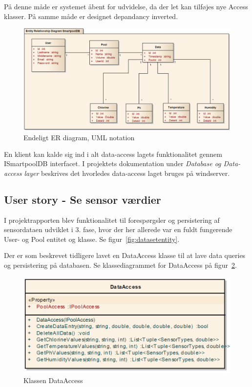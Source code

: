 På denne måde er systemet åbent for udvidelse, da der let kan tilføjes nye Access klasser. På samme måde er designet depandancy inverted.

\begin{figure}[h]
	\centering
	\includegraphics[width=\linewidth]{figs/design/databaseERD_final_uml}
	\caption{Endeligt ER diagram, UML notation}
	\label{fig:databaseERD_final_uml}
\end{figure}

En klient kan kalde sig ind i alt data-access lagets funktionalitet gennem ISmartpoolDB interfacet. I projektets dokumentation under \textit{Database og Data-access layer} beskrives det hvorledes data-access laget bruges på \gls{windserver}.

\subsection{User story - Se sensor værdier}

I projektrapporten blev funktionalitet til forespørgsler og persistering af sensordataen udviklet i 3. fase, hvor der her allerede var en fuldt fungerende User- og Pool entitet og klasse. Se figur~\ref{fig:datasetentity}.

Der er som beskrevet tidligere lavet en DataAccess klasse til at lave data queries og persistering på databasen. Se klassediagrammet for DataAccess på figur~\ref{fig:dataAccess}.
	
\begin{figure}[h]
\centering
\includegraphics[width=0.7\linewidth]{figs/database/dataAccess}
\caption{Klassen DataAccess}
\label{fig:dataAccess}
\end{figure}


